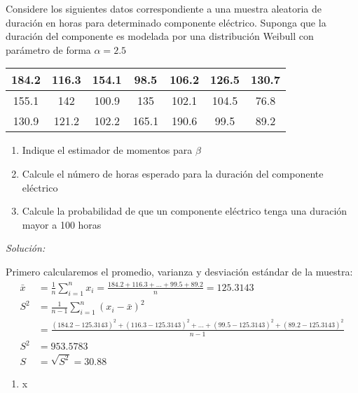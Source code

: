\documentclass[12pt]{article}
\newenvironment{problem}[2][Problema]{\begin{trivlist}
\item[\hskip \labelsep {\bfseries #1}\hskip \labelsep {\bfseries #2.}]}{\end{trivlist}}
\newenvironment{sol}
    {\emph{Solución:}
    }
    {
    }
\begin{document}
\begin{problem}{II}
Considere los siguientes datos correspondiente a una muestra aleatoria de duración en horas para determinado componente eléctrico. Suponga que la duración del componente es modelada por una distribución Weibull con parámetro de forma $\alpha=2.5$



\begin{table}[h]
    \centering %
    \begin{tabular}{|c|c|c|c|c|c|c|} %
        \hline
        184.2 & 116.3 & 154.1 & 98.5 & 106.2 & 126.5 & 130.7 \\ \hline
        155.1 & 142 & 100.9 & 135 & 102.1 & 104.5 & 76.8 \\ \hline
        130.9 & 121.2 & 102.2 & 165.1 & 190.6 & 99.5 & 89.2 \\ \hline
    \end{tabular}
    \label{tab:duracion} %
\end{table}

\begin{enumerate}[label=\alph*)] %
    \item Indique el estimador de momentos para $\beta$
    \item Calcule el número de horas esperado para la duración del componente eléctrico
    \item Calcule la probabilidad de que un componente eléctrico tenga una duración mayor a 100 horas
\end{enumerate}


\end{problem}
\begin{sol}

Primero calcularemos el promedio, varianza y desviación estándar de la muestra:
\begin{align*}
\bar{x} &= \frac{1}{n} \sum_{i=1}^{n}x_i=\frac{184.2+116.3+...+99.5+89.2}{n} =  125.3143 \\
S^2 &= \frac{1}{n-1} \sum_{i=1}^{n} (x_i - \bar{x})^2 \\
&=\frac{(184.2-125.3143)^2 + (116.3-125.3143)^2 +...+(99.5-125.3143)^2 +(89.2-125.3143)^2 }{n-1}\\
S^2 &=953.5783 \\
S &= \sqrt{S^2}=30.88
\end{align*}
\begin{enumerate}[label=\alph*)] %
    
\item x
\end{enumerate}
\end{sol}





\end{document}
